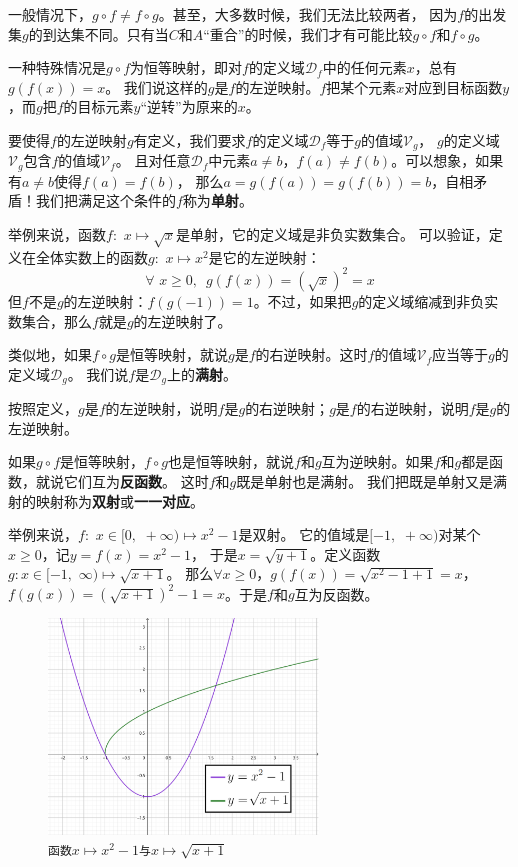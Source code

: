 \documentclass[12pt,UTF8]{ctexbook}
\begin{document}
一般情况下，$g\circ f \neq f\circ g$。甚至，大多数时候，我们无法比较两者，
因为$f$的出发集$g$的到达集不同。只有当$C$和$A$“重合”的时候，我们才有可能比较$g\circ f$和$f\circ g$。

一种特殊情况是$g\circ f$为恒等映射，即对$f$的定义域$\mathcal{D}_f$中的任何元素$x$，总有$g(f(x)) = x$。
我们说这样的$g$是$f$的左逆映射。$f$把某个元素$x$对应到目标函数$y$，而$g$把$f$的目标元素$y$“逆转”为原来的$x$。

要使得$f$的左逆映射$g$有定义，我们要求$f$的定义域$\mathcal{D}_f$等于$g$的值域$\mathcal{V}_g$，
$g$的定义域$\mathcal{V}_g$包含$f$的值域$\mathcal{V}_f$。
且对任意$\mathcal{D}_f$中元素$a \neq b$，$f(a) \neq f(b)$。可以想象，如果有$a \neq b$使得$f(a) = f(b)$，
那么$a = g(f(a)) = g(f(b)) = b$，自相矛盾！我们把满足这个条件的$f$称为\textbf{单射}。

举例来说，函数$f: \,\,x \mapsto \sqrt{x}$是单射，它的定义域是非负实数集合。
可以验证，定义在全体实数上的函数$g:\,\, x \mapsto x^2$是它的左逆映射：
$$ \forall \,\, x \geqslant 0, \,\,\, g(f(x)) = \left(\sqrt{x}\right)^2 = x$$
但$f$不是$g$的左逆映射：$f(g(-1)) = 1$。不过，如果把$g$的定义域缩减到非负实数集合，那么$f$就是$g$的左逆映射了。

类似地，如果$f\circ g$是恒等映射，就说$g$是$f$的右逆映射。这时$f$的值域$\mathcal{V}_f$应当等于$g$的定义域$\mathcal{D}_g$。
我们说$f$是$\mathcal{D}_g$上的\textbf{满射}。

按照定义，$g$是$f$的左逆映射，说明$f$是$g$的右逆映射；$g$是$f$的右逆映射，说明$f$是$g$的左逆映射。

如果$g\circ f$是恒等映射，$f\circ g$也是恒等映射，就说$f$和$g$互为逆映射。如果$f$和$g$都是函数，就说它们互为\textbf{反函数}。
这时$f$和$g$既是单射也是满射。
我们把既是单射又是满射的映射称为\textbf{双射}或\textbf{一一对应}。

举例来说，$f: \,\,x\in[0,\,\,+\infty) \mapsto x^2 - 1$是双射。
它的值域是$[-1,\,\,+\infty)$对某个$x\geqslant 0$，记$y = f(x) = x^2 - 1$，
于是$x = \sqrt{y + 1}$。定义函数$g:x\in[-1, \,\,\infty)\mapsto\sqrt{x + 1}$。
那么$\forall x \geqslant 0$，$g(f(x)) = \sqrt{x^2 - 1 + 1} = x$，
$f(g(x)) = \left(\sqrt{x + 1}\right)^2 - 1 = x$。于是$f$和$g$互为反函数。

\begin{figure}[h] %
    \vspace{4pt}
    \centering
    \includegraphics[width=0.64\textwidth]{tu/反函数2.png}
    \caption*{\texttt{函数}$x\mapsto x^2 - 1$\texttt{与}$x\mapsto \sqrt{x + 1}$}
\end{figure}
\end{document}
